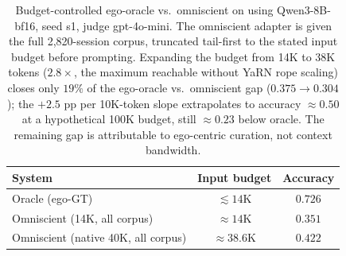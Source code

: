\begin{table}[h]
\centering
\small
\caption{Budget-controlled ego-oracle vs.\ omniscient on \benchL using
Qwen3-8B-bf16, seed s1, judge gpt-4o-mini. The omniscient adapter is given
the full 2{,}820-session corpus, truncated tail-first to the stated input
budget before prompting. Expanding the budget from 14K to 38K tokens
($2.8\times$, the maximum reachable without YaRN rope scaling)
closes only $19\%$ of the ego-oracle vs.\ omniscient gap ($0.375 \to
0.304$); the $+2.5$ pp per 10K-token slope extrapolates to accuracy
$\approx 0.50$ at a hypothetical 100K budget, still $\approx 0.23$ below
oracle. The remaining gap is attributable to ego-centric curation, not
context bandwidth.}
\label{tab:p1a-budget}
\begin{tabular}{lcc}
\toprule
System                             & Input budget    & Accuracy \\
\midrule
Oracle (ego-GT)                    & $\lesssim 14$K  & $0.726$ \\
Omniscient (14K, all corpus)       & $\approx 14$K   & $0.351$ \\
Omniscient (native 40K, all corpus)& $\approx 38.6$K & $0.422$ \\
\bottomrule
\end{tabular}
\end{table}
